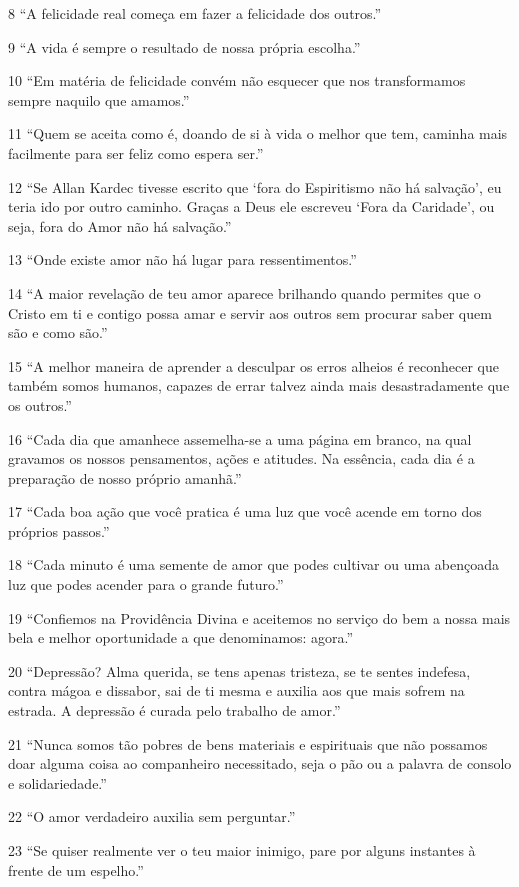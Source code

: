 8 ``A felicidade real começa em fazer a felicidade dos outros.”

9 ``A vida é sempre o resultado de nossa própria escolha.”

10 ``Em matéria de felicidade convém não esquecer que nos transformamos sempre naquilo que amamos.”

11 ``Quem se aceita como é, doando de si à vida o melhor que tem, caminha mais facilmente para ser feliz como espera ser.”

12 ``Se Allan Kardec tivesse escrito que ‘fora do Espiritismo não há salvação’, eu teria ido por outro caminho. Graças a Deus ele escreveu ‘Fora da Caridade’, ou seja, fora do Amor não há salvação.”

13 ``Onde existe amor não há lugar para ressentimentos.”

14 ``A maior revelação de teu amor aparece brilhando quando permites que o Cristo em ti e contigo possa amar e servir aos outros sem procurar saber quem são e como são.”

15 ``A melhor maneira de aprender a desculpar os erros alheios é reconhecer que também somos humanos, capazes de errar talvez ainda mais desastradamente que os outros.”

16 ``Cada dia que amanhece assemelha-se a uma página em branco, na qual gravamos os nossos pensamentos, ações e atitudes. Na essência, cada dia é a preparação de nosso próprio amanhã.”

17 ``Cada boa ação que você pratica é uma luz que você acende em torno dos próprios passos.”

18 ``Cada minuto é uma semente de amor que podes cultivar ou uma abençoada luz que podes acender para o grande futuro.”

19 ``Confiemos na Providência Divina e aceitemos no serviço do bem a nossa mais bela e melhor oportunidade a que denominamos: agora.”

20 ``Depressão? Alma querida, se tens apenas tristeza, se te sentes indefesa, contra mágoa e dissabor, sai de ti mesma e auxilia aos que mais sofrem na estrada. A depressão é curada pelo trabalho de amor.”

21 ``Nunca somos tão pobres de bens materiais e espirituais que não possamos doar alguma coisa ao companheiro necessitado, seja o pão ou a palavra de consolo e solidariedade.”

22 ``O amor verdadeiro auxilia sem perguntar.”

23 ``Se quiser realmente ver o teu maior inimigo, pare por alguns instantes à frente de um espelho.”

